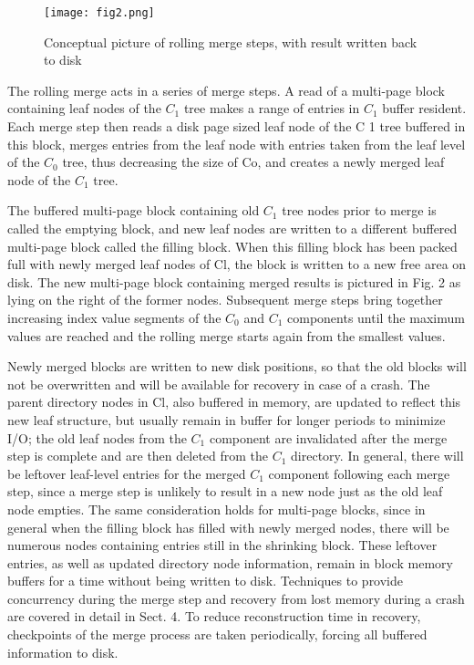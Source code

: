 \documentclass[a4paper,12pt,notitlepage,twoside,openright]{article}
\begin{document}
\begin{figure}
  \centering
  \texttt{[image: fig2.png]}
  \caption{Conceptual picture of rolling merge steps, with result written
back to disk}
\end{figure}

The rolling merge acts in a series of merge steps. A read of a
multi-page block containing leaf nodes of the \(C_1\) tree makes a range of
entries in \(C_1\) buffer resident. Each merge step then reads a disk page
sized leaf node of the C 1 tree buffered in this block, merges entries
from the leaf node with entries taken from the leaf level of the \(C_0\)
tree, thus decreasing the size of Co, and creates a newly merged leaf
node of the \(C_1\) tree.

The buffered multi-page block containing old \(C_1\) tree nodes prior to
merge is called the emptying block, and new leaf nodes are written to a
different buffered multi-page block called the filling block. When this
filling block has been packed full with newly merged leaf nodes of Cl,
the block is written to a new free area on disk. The new multi-page
block containing merged results is pictured in Fig. 2 as lying on the
right of the former nodes. Subsequent merge steps bring together
increasing index value segments of the \(C_0\) and \(C_1\) components until the
maximum values are reached and the rolling merge starts again from the
smallest values.

Newly merged blocks are written to new disk positions, so that the old
blocks will not be overwritten and will be available for recovery in
case of a crash. The parent directory nodes in Cl, also buffered in
memory, are updated to reflect this new leaf structure, but usually
remain in buffer for longer periods to minimize I/O; the old leaf nodes
from the \(C_1\) component are invalidated after the merge step is complete
and are then deleted from the \(C_1\) directory. In general, there will be
leftover leaf-level entries for the merged \(C_1\) component following each
merge step, since a merge step is unlikely to result in a new node just
as the old leaf node empties. The same consideration holds for
multi-page blocks, since in general when the filling block has filled
with newly merged nodes, there will be numerous nodes containing entries
still in the shrinking block. These leftover entries, as well as updated
directory node information, remain in block memory buffers for a time
without being written to disk. Techniques to provide concurrency during
the merge step and recovery from lost memory during a crash are covered
in detail in Sect. 4. To reduce reconstruction time in recovery,
checkpoints of the merge process are taken periodically, forcing all
buffered information to disk.
\end{document}
